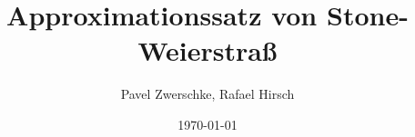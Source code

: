 \documentclass{beamer}
\title[Satz von Stone-Weierstraß]{Approximationssatz von Stone-Weierstraß}
\author{Pavel Zwerschke, Rafael Hirsch}
\date{\today}
\begin{document}
\begin{frame}
    \maketitle
\end{frame}




\end{document}
